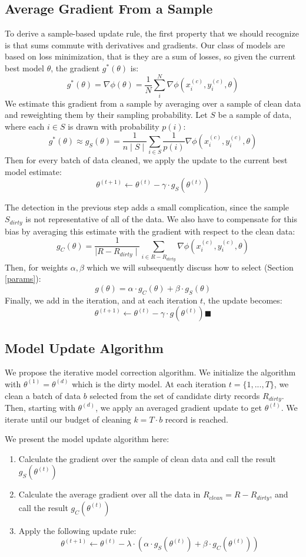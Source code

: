 \subsection{Average Gradient From a Sample}
To derive a sample-based update rule, the first property that we should recognize is that sums commute with derivatives and gradients.
Our class of models are based on loss minimization, that is they are a sum of losses, so given the current best model $\theta$, the gradient $g^*(\theta)$ is:
\[
g^*(\theta) = \nabla\phi(\theta) = \frac{1}{N} \sum_i^N \nabla\phi(x_i^{(c)},y_i^{(c)},\theta)
\]
We estimate this gradient from a sample by averaging over a sample of clean data and reweighting them by their sampling probability.
Let $S$ be a sample of data, where each $i \in S$ is drawn with probability $p(i)$:
\[
g^*(\theta) \approx g_{S}(\theta) = \frac{1}{n\mid S \mid} \sum_{i \in S}\frac{1}{p(i)}\nabla\phi(x_i^{(c)},y_i^{(c)},\theta)
\]
Then for every batch of data cleaned, we apply the update to the current best model estimate:
\[
\theta^{(t+1)} \leftarrow \theta^{(t)} - \gamma \cdot g_{S}(\theta^{(t)})
\]

The detection in the previous step adds a small complication, since the sample $S_{dirty}$ is not representative of all of the data.
We also have to compensate for this bias by averaging this estimate with the gradient with respect to the clean data:
\[
g_C(\theta) = \frac{1}{\mid R - R_{dirty}\mid}\sum_{i \in R - R_{dirty}}\nabla\phi(x_i^{(c)},y_i^{(c)},\theta)
\]
Then, for weights $\alpha,\beta$ which we will subsequently discuss how to select (Section \ref{params}):
\[
g(\theta) = \alpha \cdot g_C(\theta) + \beta \cdot g_S(\theta)
\]
Finally, we add in the iteration, and at each iteration $t$, the update becomes:
\[
\theta^{(t+1)} \leftarrow \theta^{(t)} - \gamma \cdot g(\theta^{(t)}) \blacksquare
\]

\subsection{Model Update Algorithm}
We propose the iterative model correction algorithm.
We initialize the algorithm with $\theta^{(1)} = \theta^{(d)}$ which is the dirty model.
At each iteration $t=\{1,...,T\}$, we clean a batch of data $b$ selected from the set of candidate dirty records $R_{dirty}$.
Then, starting with $\theta^{(d)}$, we apply an averaged gradient update to get $\theta^{(t)}$.
We iterate until our budget of cleaning $k = T \cdot b$ record is reached.

We present the model update algorithm here:
\begin{enumerate}[noitemsep]
	\item Calculate the gradient over the sample of clean data and call the result $g_S(\theta^{(t)})$
	\item Calculate the average gradient over all the data in $R_{clean}=R-R_{dirty}$, and call the result $g_C(\theta^{(t)})$
	\item Apply the following update rule:
	\[
	\theta^{(t+1)} \leftarrow \theta^{(t)} - \lambda \cdot(\alpha\cdot g_S(\theta^{(t)}) + \beta \cdot  g_C(\theta^{(t)}))
	\]
\end{enumerate} 

